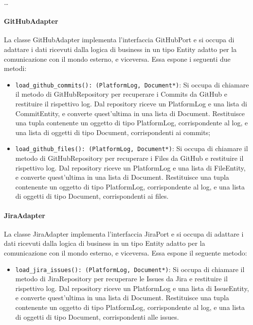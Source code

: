 \dots

\paragraph{GitHubAdapter}
\label{sec:github_adapter}
La classe GitHubAdapter implementa l'interfaccia GitHubPort e si occupa di adattare i dati ricevuti dalla logica di business in un tipo Entity adatto per la comunicazione con il mondo esterno, e viceversa. Essa espone i seguenti due metodi:
\begin{itemize}
    \item \texttt{load\_github\_commits(): (PlatformLog, Document*)}: Si occupa di chiamare il metodo di GitHubRepository per recuperare i Commits da GitHub e restituire il rispettivo log. Dal repository riceve un PlatformLog e una lista di CommitEntity, e converte quest'ultima in una lista di Document. Restituisce una tupla contenente un oggetto di tipo PlatformLog, corrispondente al log, e una lista di oggetti di tipo Document, corrispondenti ai commits;
    \item \texttt{load\_github\_files(): (PlatformLog, Document*)}: Si occupa di chiamare il metodo di GitHubRepository per recuperare i Files da GitHub e restituire il rispettivo log. Dal repository riceve un PlatformLog e una lista di FileEntity, e converte quest'ultima in una lista di Document. Restituisce una tupla contenente un oggetto di tipo PlatformLog, corrispondente al log, e una lista di oggetti di tipo Document, corrispondenti ai files.
\end{itemize}

\paragraph{JiraAdapter}
\label{sec:jira_adapter}
La classe JiraAdapter implementa l'interfaccia JiraPort e si occupa di adattare i dati ricevuti dalla logica di business in un tipo Entity adatto per la comunicazione con il mondo esterno, e viceversa. Essa espone il seguente metodo:
\begin{itemize}
    \item \texttt{load\_jira\_issues(): (PlatformLog, Document*)}: Si occupa di chiamare il metodo di JiraRepository per recuperare le Issues da Jira e restituire il rispettivo log. Dal repository riceve un PlatformLog e una lista di IssueEntity, e converte quest'ultima in una lista di Document. Restituisce una tupla contenente un oggetto di tipo PlatformLog, corrispondente al log, e una lista di oggetti di tipo Document, corrispondenti alle issues.
\end{itemize}

